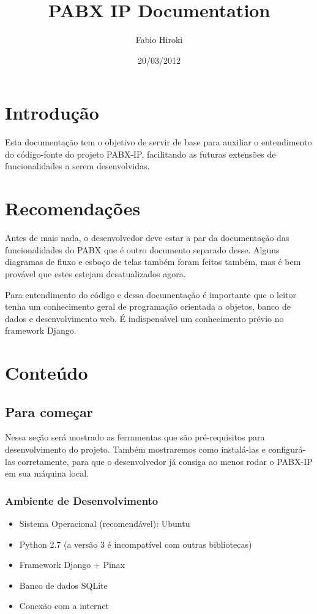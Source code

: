 \documentclass[letterpaper,10pt,brazil]{sphinxmanual}
\title{PABX IP Documentation}
\date{20/03/2012}
\author{Fabio Hiroki}
\begin{document}
\maketitle
\tableofcontents
{}\label{index::doc}



\chapter{Introdução}
\label{index:bem-vindo-a-documentacao-do-projeto-pabx-ip}\label{index:introducao}
Esta documentação tem o objetivo de servir de base para auxiliar o entendimento do código-fonte do projeto PABX-IP, facilitando as futuras extensões de funcionalidades a serem desenvolvidas.


\chapter{Recomendações}
\label{index:recomendacoes}
Antes de mais nada, o desenvolvedor deve estar a par da documentação das funcionalidades do PABX que é outro documento separado desse. Alguns diagramas de fluxo e esboço de telas também foram feitos também, mas é bem provável que estes estejam desatualizados agora.

Para entendimento do código e dessa documentação é importante que o leitor tenha um conhecimento geral de programação orientada a objetos, banco de dados e desenvolvimento web. É indispensável um conhecimento prévio no framework Django.


\chapter{Conteúdo}
\label{index:conteudo}

\section{Para começar}
\label{inicio::doc}\label{inicio:para-comecar}
Nessa seção será mostrado as ferramentas que são pré-requisitos para desenvolvimento do projeto. Também mostraremos como instalá-las e configurá-las corretamente, para que o desenvolvedor já consiga ao menos rodar o PABX-IP em sua máquina local.


\subsection{Ambiente de Desenvolvimento}
\label{inicio:ambiente-de-desenvolvimento}\begin{itemize}
\item {} 
Sistema Operacional (recomendável): Ubuntu

\item {} 
Python 2.7 (a versão 3 é incompatível com outras bibliotecas)

\item {} 
Framework Django + Pinax

\item {} 
Banco de dados SQLite

\item {} 
Conexão com a internet

\end{itemize}
\end{document}
